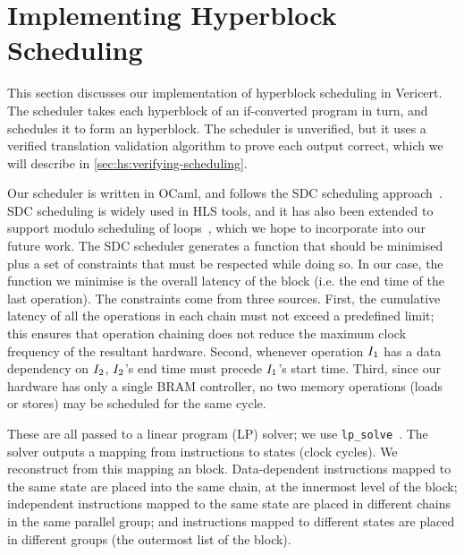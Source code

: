 \section{Implementing Hyperblock Scheduling}
\label{sec:hs:implementing-scheduling}

This section discusses our implementation of hyperblock scheduling in Vericert.
The scheduler takes each hyperblock of an if-converted \rtlblock{} program in
turn, and schedules it to form an \rtlpar{} hyperblock. The scheduler is
unverified, but it uses a verified translation validation algorithm to prove
each output correct, which we will describe in
\cref{sec:hs:verifying-scheduling}.

Our scheduler is written in OCaml, and follows the SDC scheduling
approach~\cite{cong06_sdc}. SDC scheduling is widely used in HLS tools, and it
has also been extended to support modulo scheduling of loops~\cite{zhang13_sdc},
which we hope to incorporate into our future work. The SDC scheduler generates a
function that should be minimised plus a set of constraints that must be
respected while doing so. In our case, the function we minimise is the overall
latency of the block (i.e. the end time of the last
operation). %
The constraints come from three sources. First, the cumulative latency of all
the operations in each chain must not exceed a predefined limit; this ensures
that operation chaining does not reduce the maximum clock frequency of the
resultant hardware. Second, whenever operation $I_1$ has a data dependency
on $I_2$, $I_2$'s end time must precede $I_1$'s start
time. Third, since our hardware has only a single \gls{BRAM} controller, no two memory
operations (loads or stores) may be scheduled for the same cycle.

These are all passed to a linear program (LP) solver; we use
\texttt{lp\_solve}~\cite{berkelaar10}.  The solver outputs a mapping from
instructions to states (clock cycles). We reconstruct from this mapping an
\rtlpar{} block. Data-dependent instructions mapped to the same state are placed
into the same chain, at the innermost level of the \rtlpar{} block; independent
instructions mapped to the same state are placed in different chains in the same
parallel group; and instructions mapped to different states are placed in
different groups (the outermost list of the \rtlpar{} block).



